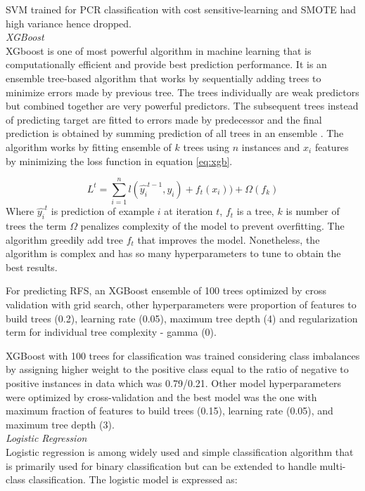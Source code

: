 \documentclass{article}
\begin{document}
SVM trained for PCR classification with cost sensitive-learning and SMOTE had high variance hence dropped.\\


\noindent\textit{XGBoost}\\
XGboost is one of most powerful algorithm in machine learning that is computationally efficient and provide best prediction performance. It is an ensemble tree-based algorithm that works by sequentially adding trees to minimize errors made by previous tree. The trees individually are weak predictors but combined together are very powerful predictors. The subsequent trees instead of predicting target are fitted to errors made by predecessor and the final prediction is obtained by summing prediction of all trees in an ensemble \cite{Chen_2016}. The algorithm works by fitting ensemble of $k$ trees using $n$ instances and $x_i$ features by minimizing the loss function in equation \ref{eq:xgb}. 


\begin{equation}
	\label{eq:xgb}
	L^t = \sum_{i=1}^{n}l(\hat{y_i}^{t-1},y_i)+f_t(x_i))+\Omega(f_k)
\end{equation}
Where $\hat{y_i}^t$ is prediction of example $i$ at iteration $t$, $f_t$ is a tree, $k$ is number of trees the term $\Omega$ penalizes complexity of the model to prevent overfitting. The algorithm greedily add tree $f_t$ that improves the model. Nonetheless, the algorithm is complex and has so many hyperparameters to tune to obtain the best results.

For predicting RFS, an XGBoost ensemble of 100 trees optimized by cross validation with grid search, other hyperparameters were proportion of features to build trees (0.2), learning rate (0.05), maximum tree depth (4) and regularization term for individual tree complexity - gamma (0).

XGBoost with 100 trees for classification was trained considering class imbalances by assigning higher weight to the positive class equal to the ratio of negative  to positive instances in data which was 0.79/0.21. Other model hyperparameters were optimized by cross-validation and the best model was the one with maximum fraction of features to build trees (0.15), learning rate (0.05), and maximum tree depth (3). \\

\noindent\textit{Logistic Regression}\\
Logistic regression is among widely used and simple classification algorithm that is primarily used for binary classification but can be extended to handle multi-class classification. The logistic model is expressed as:
\end{document}
